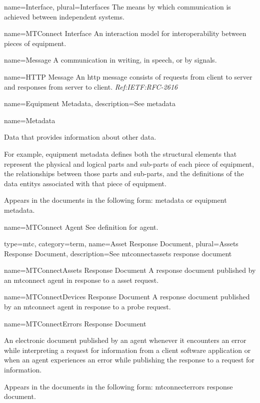 {
  name={Interface},
  plural={Interfaces}
}
{
	The means by which communication is achieved between independent systems.
}

{
  name={MTConnect Interface}
}
{
	An \gls{interaction model} for interoperability between pieces of equipment.
}


{
  name={Message}
}
{
	A communication in writing, in speech, or by signals.
}

{
  name={HTTP Message}
}
{
	An \gls{http message} consists of requests from client to server and responses from server to client. \textit{Ref:IETF:RFC-2616}
}


{
  name={Equipment Metadata},
  description={See \gls{metadata}}
}


{
  name={Metadata}
}
{
	Data that provides information about other data.

	For example, \gls{equipment metadata} defines both the \glspl{structural element} that represent the physical and logical parts and sub-parts of each piece of equipment, the relationships between those parts and sub-parts, and the definitions of the \glspl{data entity} associated with that piece of equipment.

	Appears in the documents in the following form: \gls{metadata} or \gls{equipment metadata}.
}


{
  name={MTConnect Agent}
}
{
	See definition for \gls{agent}.
}


{
  type=mtc,
  category=term,
  name={Asset Response Document},
  plural={Assets Response Document},
  description={See \gls{mtconnectassets response document}}
}

{
  name={MTConnectAssets Response Document}
}
{
	A \gls{response document} published by an \gls{mtconnect agent} in response to a \gls{asset request}.
}


{
  name={MTConnectDevices Response Document}
}
{
	A \gls{response document} published by an \gls{mtconnect agent} in response to a \gls{probe request}.
}


{
  name={MTConnectErrors Response Document}
}
{
	An electronic document published by an \gls{agent} whenever it encounters an error while interpreting a \gls{request} for information from a client software application or when an \gls{agent} experiences an error while publishing the \gls{response} to a \gls{request} for information.

	Appears in the documents in the following form: \gls{mtconnecterrors response document}.
}


